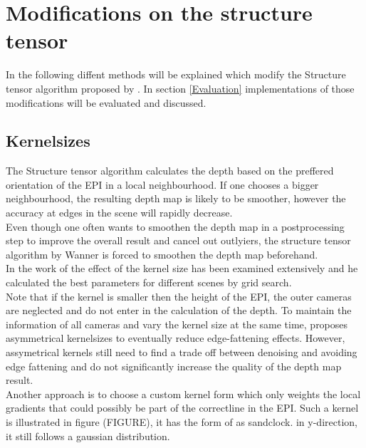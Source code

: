 \documentclass  [
  paper    = a4,
  BCOR     = 10mm,
  twoside,
  fontsize = 12pt,
  fleqn,
  toc      = bibnumbered,
  toc      = listofnumbered,
  numbers  = noendperiod,
  headings = normal,
  listof   = leveldown,
  version  = 3.03
]                                       {scrreprt}
\begin{document}
 \section{Modifications on the structure tensor}
 In the following diffent methods will be explained which modify the Structure tensor algorithm proposed by \cite{wanner2014orientation}. In section \ref{Evaluation} implementations of those modifications will be evaluated and discussed.
 \subsection{Kernelsizes}
 The Structure tensor algorithm calculates the depth based on the preffered orientation of the EPI in a local neighbourhood. If one chooses a bigger neighbourhood, the resulting depth map is likely to be smoother, however the accuracy at edges in the scene will rapidly decrease.\\
 Even though one often wants to smoothen the depth map in a postprocessing step to improve the overall result and cancel out outlyiers, the structure tensor algorithm by Wanner is forced to smoothen the depth map beforehand.\\
 In the work of \cite{wanner2014orientation} the effect of the kernel size has been examined extensively and he calculated the best parameters for different scenes by grid search.\\
 Note that if the kernel is smaller then the height of the EPI, the outer cameras are neglected and do not enter in the calculation of the depth. To maintain the information of all cameras and vary the kernel size at the same time, \cite{diebold2016light} proposes asymmetrical kernelsizes to eventually reduce edge-fattening effects. However, assymetrical kernels still need to find a trade off between denoising and avoiding edge fattening and do not significantly increase the quality of the depth map result.\\
 Another approach is to choose a custom kernel form which only weights the local gradients that could possibly be part of the \glqq correct\grqq line in the EPI. Such a kernel is illustrated in figure (FIGURE), it has the form of as sandclock. in y-direction, it still follows a gaussian distribution.
\end{document}
